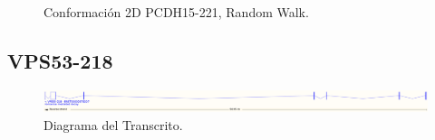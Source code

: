 \documentclass[a4paper,11pt,titlepage]{article}
\theoremstyle{definition}
\begin{document}
\begin{figure}[H]
\begin{minipage}[c]{0.23\textwidth}
        \caption{Conformación 2D PCDH15-221, Random Walk.}
        \label{fig:PCDH15-221-rndw}
    \end{minipage}
\end{figure}

\newpage
\subsection*{VPS53-218}\label{subsec:gene3}

\begin{figure}[H]
    \centering
    \includegraphics[width=\textwidth]{images/VPS53-218.png}
    \caption{Diagrama del Transcrito.}
    \label{fig:VPS53-218-diag}
\end{figure}
\end{document}
